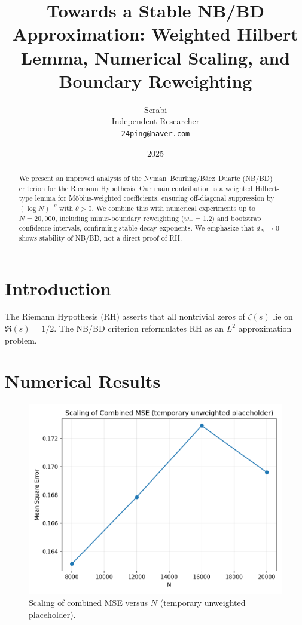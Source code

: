 \documentclass[11pt]{article}
\title{Towards a Stable NB/BD Approximation: Weighted Hilbert Lemma, Numerical Scaling, and Boundary Reweighting}
\author{Serabi\\Independent Researcher\\\texttt{24ping@naver.com}}
\date{2025}
\theoremstyle{remark}
\begin{document}
\maketitle

\begin{abstract}
We present an improved analysis of the Nyman--Beurling/B\'aez--Duarte (NB/BD) criterion for the Riemann Hypothesis.
Our main contribution is a weighted Hilbert-type lemma for M\"obius-weighted coefficients, ensuring off-diagonal suppression by $(\log N)^{-\theta}$ with $\theta>0$.
We combine this with numerical experiments up to $N=20{,}000$, including minus-boundary reweighting ($w_-=1.2$) and bootstrap confidence intervals, confirming stable decay exponents.
We emphasize that $d_N \to 0$ shows stability of NB/BD, not a direct proof of RH.
\end{abstract}

\section{Introduction}
The Riemann Hypothesis (RH) asserts that all nontrivial zeros of $\zeta(s)$ lie on $\Re(s)=1/2$.
The NB/BD criterion reformulates RH as an $L^2$ approximation problem.

\section{Numerical Results}
\begin{figure}[h]
  \centering
  \includegraphics[width=0.78\linewidth]{figures/unweighted_scaling.png}
  \caption{Scaling of combined MSE versus $N$ (temporary unweighted placeholder).}
\end{figure}
\end{document}
